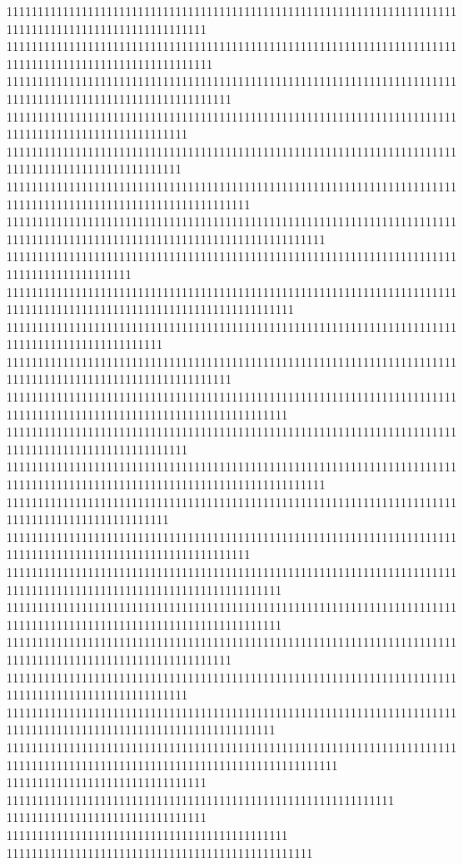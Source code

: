 11111111111111111111111111111111111111111111111111111111111111111111111111111111111111111111111111111111
111111111111111111111111111111111111111111111111111111111111111111111111111111111111111111111111111111111
111111111111111111111111111111111111111111111111111111111111111111111111111111111111111111111111111111111111
11111111111111111111111111111111111111111111111111111111111111111111111111111111111111111111111111111
1111111111111111111111111111111111111111111111111111111111111111111111111111111111111111111111111111
111111111111111111111111111111111111111111111111111111111111111111111111111111111111111111111111111111111111111
111111111111111111111111111111111111111111111111111111111111111111111111111111111111111111111111111111111111111111111111111
11111111111111111111111111111111111111111111111111111111111111111111111111111111111111111111
1111111111111111111111111111111111111111111111111111111111111111111111111111111111111111111111111111111111111111111111
1111111111111111111111111111111111111111111111111111111111111111111111111111111111111111111111111
111111111111111111111111111111111111111111111111111111111111111111111111111111111111111111111111111111111111
111111111111111111111111111111111111111111111111111111111111111111111111111111111111111111111111111111111111111111111
11111111111111111111111111111111111111111111111111111111111111111111111111111111111111111111111111111
111111111111111111111111111111111111111111111111111111111111111111111111111111111111111111111111111111111111111111111111111
11111111111111111111111111111111111111111111111111111111111111111111111111111111111111111111111111
111111111111111111111111111111111111111111111111111111111111111111111111111111111111111111111111111111111111111
11111111111111111111111111111111111111111111111111111111111111111111111111111111111111111111111111111111111111111111
11111111111111111111111111111111111111111111111111111111111111111111111111111111111111111111111111111111111111111111
111111111111111111111111111111111111111111111111111111111111111111111111111111111111111111111111111111111111
11111111111111111111111111111111111111111111111111111111111111111111111111111111111111111111111111111
1111111111111111111111111111111111111111111111111111111111111111111111111111111111111111111111111111111111111111111
11111111111111111111111111111111111111111111111111111111111111111111111111111111111111111111111111111111111111111111111111111
11111111111111111111111111111111
11111111111111111111111111111111111111111111111111111111111111
11111111111111111111111111111111
111111111111111111111111111111111111111111111
1111111111111111111111111111111111111111111111111

